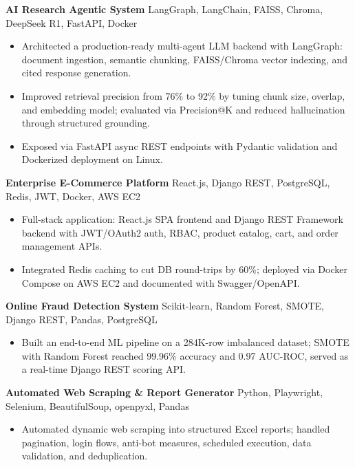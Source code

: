 \documentclass[10pt,a4paper]{article}
\begin{document}
{\small\textbf{AI Research Agentic System} \textbar{} LangGraph, LangChain, FAISS, Chroma, DeepSeek R1, FastAPI, Docker}
\begin{itemize}
  \item Architected a production-ready multi-agent LLM backend with LangGraph: document ingestion, semantic chunking, FAISS/Chroma vector indexing, and cited response generation.
  \item Improved retrieval precision from 76\% to 92\% by tuning chunk size, overlap, and embedding model; evaluated via Precision@K and reduced hallucination through structured grounding.
  \item Exposed via FastAPI async REST endpoints with Pydantic validation and Dockerized deployment on Linux.
\end{itemize}

\vspace{3pt}
{\small\textbf{Enterprise E-Commerce Platform} \textbar{} React.js, Django REST, PostgreSQL, Redis, JWT, Docker, AWS EC2}
\begin{itemize}
  \item Full-stack application: React.js SPA frontend and Django REST Framework backend with JWT/OAuth2 auth, RBAC, product catalog, cart, and order management APIs.
  \item Integrated Redis caching to cut DB round-trips by 60\%; deployed via Docker Compose on AWS EC2 and documented with Swagger/OpenAPI.
\end{itemize}

\vspace{3pt}
{\small\textbf{Online Fraud Detection System} \textbar{} Scikit-learn, Random Forest, SMOTE, Django REST, Pandas, PostgreSQL}
\begin{itemize}
  \item Built an end-to-end ML pipeline on a 284K-row imbalanced dataset; SMOTE with Random Forest reached 99.96\% accuracy and 0.97 AUC-ROC, served as a real-time Django REST scoring API.
\end{itemize}

\vspace{3pt}
{\small\textbf{Automated Web Scraping \& Report Generator} \textbar{} Python, Playwright, Selenium, BeautifulSoup, openpyxl, Pandas}
\begin{itemize}
  \item Automated dynamic web scraping into structured Excel reports; handled pagination, login flows, anti-bot measures, scheduled execution, data validation, and deduplication.
\end{itemize}
\end{document}
